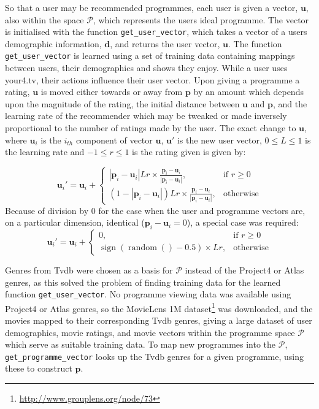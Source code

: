 So that a user may be recommended programmes, each user is given a vector, $\mathbf{u}$, also within the space $\mathcal{P}$, which represents the users ideal programme. The vector is initialised with the function \texttt{get\_user\_vector}, which takes a vector of a users demographic information, $\mathbf{d}$, and returns the user vector, $\mathbf{u}$. The function \texttt{get\_user\_vector} is learned using a set of training data containing mappings between users, their demographics and shows they enjoy. While a user uses your4.tv, their actions influence their user vector. Upon giving a programme a rating, $\mathbf{u}$ is moved either towards or away from $\mathbf{p}$ by an amount which depends upon the magnitude of the rating, the initial distance between $\mathbf{u}$ and $\mathbf{p}$, and the learning rate of the recommender which may be tweaked or made inversely proportional to the number of ratings made by the user. The exact change to $\mathbf{u}$, where $\mathbf{u}_{i}$ is the $i_{th}$ component of vector $\mathbf{u}$, $\mathbf{u}'$ is the new user vector, $0 \leq L \leq 1$ is the learning rate and $-1 \leq r \leq 1$ is the rating given is given by:

$$
	\mathbf{u}_{i}' =
	\mathbf{u}_{i} + \begin{cases}
		\left|\mathbf{p}_{i}-\mathbf{u}_{i}\right|Lr \times \frac{\mathbf{p}_{i}-\mathbf{u}_{i}}{\left|\mathbf{p}_{i}-\mathbf{u}_{i}\right|},&
			\text{if } r\geq 0\\
		(1-\left|\mathbf{p}_{i}-\mathbf{u}_{i}\right|)Lr \times \frac{\mathbf{p}_{i}-\mathbf{u}_{i}}{\left|\mathbf{p}_{i}-\mathbf{u}_{i}\right|},&
			\text{otherwise}
	\end{cases}
$$
Because of division by 0 for the case when the user and programme vectors are, on a particular dimension, identical ($\mathbf{p}_{i}-\mathbf{u}_{i}=0$), a special case was required:
$$
	\mathbf{u}_{i}' =
	\mathbf{u}_{i} + \begin{cases}
		0,&
			\text{if } r\geq 0\\
		\operatorname{sign}(\operatorname{random}()-0.5)\times Lr,&
			\text{otherwise}
	\end{cases}
$$

Genres from Tvdb were chosen as a basis for $\mathcal{P}$ instead of the Project4 or Atlas genres, as this solved the problem of finding training data for the learned function \texttt{get\_user\_vector}. No programme viewing data was available using Project4 or Atlas genres, so the MovieLens 1M dataset\footnote{\url{http://www.grouplens.org/node/73}} was downloaded, and the movies mapped to their corresponding Tvdb genres, giving a large dataset of user demographics, movie ratings, and movie vectors within the programme space $\mathcal{P}$ which serve as suitable training data. To map new programmes into the $\mathcal{P}$, \texttt{get\_programme\_vector} looks up the Tvdb genres for a given programme, using these to construct $\mathbf{p}$.

